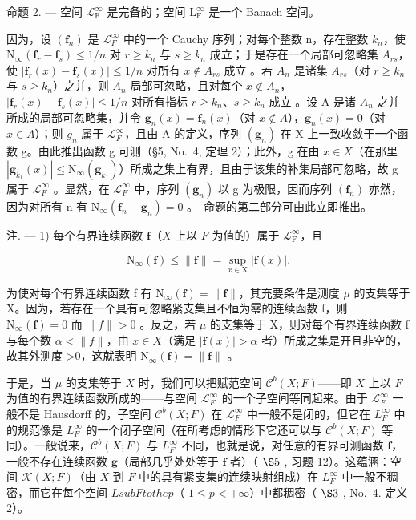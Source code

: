 命题 2. --- 空间 \(\mathcal{L}_{\mathrm{F}}^{\infty}\) 是完备的；空间 \(\mathrm{L}_{\mathrm{F}}^{\infty}\) 是一个 Banach 空间。

因为，设 \((\mathbf{f}_{n})\) 是 \(\mathcal{L}_{F}^{\infty}\) 中的一个 Cauchy 序列；对每个整数 n，存在整数 \(k_{n}\)，使 \(\mathrm{N}_{\infty}(\mathbf{f}_{r}-\mathbf{f}_{s})\leqslant1/n\) 对 \(r\geqslant k_{n}\) 与 \(s\geqslant k_{n}\) 成立；于是存在一个局部可忽略集 \(A_{rs}\)，使 \(|\mathbf{f}_{r}(x)-\mathbf{f}_{s}(x)|\leqslant1/n\) 对所有 \(x\notin A_{rs}\) 成立 。若 \(A_{n}\) 是诸集 \(A_{rs}\)（对 \(r\geqslant k_{n}\) 与 \(s\geqslant k_{n}\)）之并，则 \(A_{n}\) 局部可忽略，且对每个 \(x\notin A_{n}\)，\(|\mathbf{f}_{r}(x)-\mathbf{f}_{s}(x)|\leqslant1/n\) 对所有指标 \(r\geqslant k_{n}\)、\(s\geqslant k_{n}\) 成立 。设 A 是诸 \(A_{n}\) 之并所成的局部可忽略集，并令 \(\mathbf{g}_{n}(x)=\mathbf{f}_{n}(x)\)（对 \(x\notin A\)），\(\mathbf{g}_{n}(x)=0\)（对 \(x\in A\)）；则 \(g_{n}\) 属于 \(\mathcal{L}_{F}^{\infty}\)，且由 A 的定义，序列 \((\mathbf{g}_{n})\) 在 X 上一致收敛于一个函数 g。由此推出函数 g 可测（§5, No.~4, 定理 2）；此外，g 在由 \(x\in X\)（在那里 \(|\mathbf{g}_{k_{1}}(x)|\leqslant\mathrm{N}_{\infty}(\mathbf{g}_{k_{1}})\)）所成之集上有界，且由于该集的补集局部可忽略，故 g 属于 \(\mathcal{L}_{F}^{\infty}\) 。显然，在 \(\mathcal{L}_{F}^{\infty}\) 中，序列 \((\mathbf{g}_{n})\) 以 g 为极限，因而序列 \((\mathbf{f}_{n})\) 亦然，因为对所有 n 有 \(\mathrm{N}_{\infty}(\mathbf{f}_{n}-\mathbf{g}_{n})=0\) 。~命题的第二部分可由此立即推出。

注. --- 1) 每个有界连续函数 \(\mathbf{f}\)（\(X\) 上以 \(F\) 为值的）属于 \(\mathcal{L}_{\mathrm{F}}^{\infty}\)，且

\[
\mathrm{N} _ {\infty} (\mathbf {f}) \leqslant \| \mathbf {f} \| = \sup _ {x \in \mathrm{X}} | \mathbf {f} (x) |.
\]

为使对每个有界连续函数 f 有 \(\mathrm{N}_{\infty}(\mathbf{f})=\|\mathbf{f}\|\)，其充要条件是测度 \(\mu\) 的支集等于 X。因为，若存在一个具有可忽略紧支集且不恒为零的连续函数 f，则 \(\mathrm{N}_{\infty}(\mathbf{f})=0\) 而 \(\|f\|>0\) 。反之，若 \(\mu\) 的支集等于 X，则对每个有界连续函数 f 与每个数 \(\alpha<\|f\|\)，由 \(x\in X\)（满足 \(|\mathbf{f}(x)|>\alpha\) 者）所成之集是开且非空的，故其外测度 \textgreater0，这就表明 \(\mathrm{N}_{\infty}(\mathbf{f})=\|\mathbf{f}\|\) 。

于是，当 \(\mu\) 的支集等于 \(X\) 时，我们可以把赋范空间 \(\mathcal{C}^b (X;F)\)——即 \(X\) 上以 \(F\) 为值的有界连续函数所成的——与空间 \(\mathcal{L}_{F}^{\infty}\) 的一个子空间等同起来。由于 \(\mathcal{L}_F^\infty\) 一般不是 Hausdorff 的，子空间 \(\mathcal{C}^b (X;F)\) 在 \(\mathcal{L}_F^\infty\) 中一般不是闭的，但它在 \(L_F^\infty\) 中的规范像是 \(L_F^\infty\) 的一个闭子空间（在所考虑的情形下它还可以与 \(\mathcal{C}^b (X;F)\) 等同）。一般说来，\(\mathcal{C}^b (X;F)\) 与 \(L_F^\infty\) 不同，也就是说，对任意的有界可测函数 \(\mathbf{f}\)，一般不存在连续函数 \(\mathbf{g}\)（局部几乎处处等于 \(\mathbf{f}\) 者）（ \(\S 5\) , 习题 12）。这蕴涵：空间 \(\mathcal{K}(X;F)\)（由 \(X\) 到 \(F\) 中的具有紧支集的连续映射组成）在 \(L_F^\infty\) 中一般不稠密，而它在每个空间 \(L sub F to the p\)（ \(1\leqslant p < +\infty\)）中都稠密（ \(\S 3\) , No.~4. 定义 2）。

